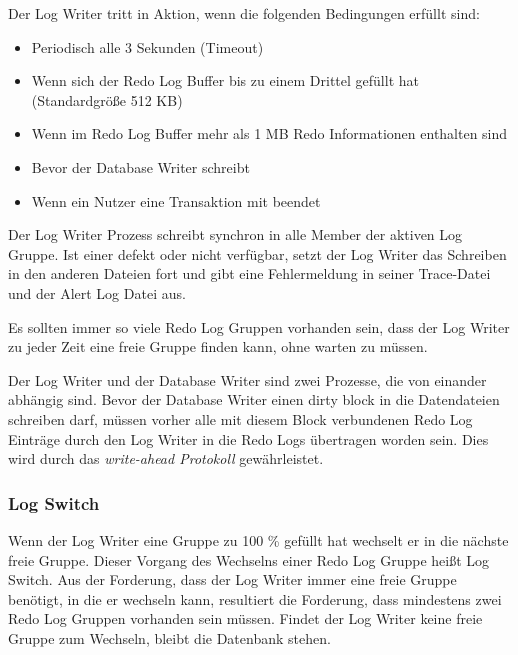           \begin{merke}
            Der Log Writer tritt in Aktion, wenn die folgenden Bedingungen erf\"ullt sind:
            \begin{itemize}
              \item Periodisch alle 3 Sekunden (Timeout)
              \item Wenn sich der Redo Log Buffer bis zu einem Drittel gef\"ullt hat (Standardgr\"o\ss{}e 512 KB)
              \item Wenn im Redo Log Buffer mehr als 1 MB Redo Informationen enthalten sind
              \item Bevor der Database Writer schreibt
              \item Wenn ein Nutzer eine Transaktion mit  beendet
            \end{itemize}
          \end{merke}
          Der Log Writer Prozess schreibt synchron in alle Member der aktiven Log Gruppe. Ist einer defekt oder nicht verf\"ugbar, setzt der Log Writer das Schreiben in den anderen Dateien fort und gibt eine Fehlermeldung in seiner Trace-Datei und der Alert Log Datei aus.
\clearpage
          \begin{merke}
            Es sollten immer so viele Redo Log Gruppen vorhanden sein, dass der Log Writer zu jeder Zeit eine freie Gruppe finden kann, ohne warten zu m\"ussen.
          \end{merke}
          Der Log Writer und der Database Writer sind zwei Prozesse, die von einander abh\"angig sind. Bevor der Database Writer einen dirty block in die Datendateien schreiben darf, m\"ussen vorher alle mit diesem Block verbundenen Redo Log Eintr\"age durch den Log Writer in die Redo Logs \"ubertragen worden sein. Dies wird durch das \textit{write-ahead Protokoll} gew\"ahrleistet.
          \subsubsection{Log Switch}
            Wenn der Log Writer eine Gruppe zu 100 \% gef\"ullt hat wechselt er in die n\"achste freie Gruppe. Dieser Vorgang des Wechselns einer Redo Log Gruppe hei\ss t Log Switch. Aus der Forderung, dass der Log Writer immer eine freie Gruppe ben\"otigt, in die er wechseln kann, resultiert die Forderung, dass mindestens zwei Redo Log Gruppen vorhanden sein m\"ussen. Findet der Log Writer keine freie Gruppe zum Wechseln, bleibt die Datenbank stehen.


